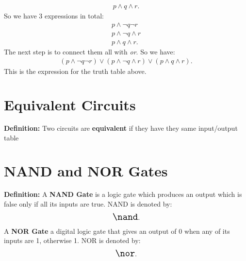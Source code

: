 \documentclass{report}
\begin{document}
    \begin{align*}
        p \land q \land r
    .\end{align*}
    \bigbreak \noindent 
    So we have 3 expressions in total:
    \begin{align*}
         p \land \neg q  \neg r \\ 
         p \land \neg q \land r \\
        p \land q \land r
    .\end{align*}
    \bigbreak \noindent 
    The next step is to connect them all with \textit{or}. So we have:
    \begin{align*}
        ( p \land \neg q  \neg r ) \lor (p \land \neg q \land r ) \lor (p \land q \land r)
    .\end{align*}
    \bigbreak \noindent 
    This is the expression for the truth table above.
    \bigbreak \noindent 
    \begin{figure}[ht]
        \centering
        \label{fig:diaphram}
    \end{figure}

    \pagebreak \bigbreak \noindent 
    \section{Equivalent Circuits}
    \bigbreak \noindent 
    \begin{mdframed}
        \textbf{Definition:}
      Two circuits are \textbf{equivalent} if they have they same input/output table

    \end{mdframed}
    \bigbreak \noindent \bigbreak \noindent 
    \section{NAND and NOR Gates}
    \bigbreak \noindent 
    \begin{mdframed}
        \textbf{Definition:}
               A \textbf{NAND Gate} is a logic gate which produces an output which is false only if all its inputs are true. NAND is denoted by:
               \begin{align*}
                   \begin{Large}\nand \end{Large}
               .\end{align*}
       A \textbf{NOR Gate} a digital logic gate that gives an output of 0 when any of its inputs are 1, otherwise 1. NOR is denoted by:
          \begin{align*}
               \begin{Large}\nor \end{Large}
           .\end{align*}

    \end{mdframed}
    \begin{figure}[ht]
        \centering
        \label{fig:tnaoheuntaoheunh}
    \end{figure}
    
\end{document}

